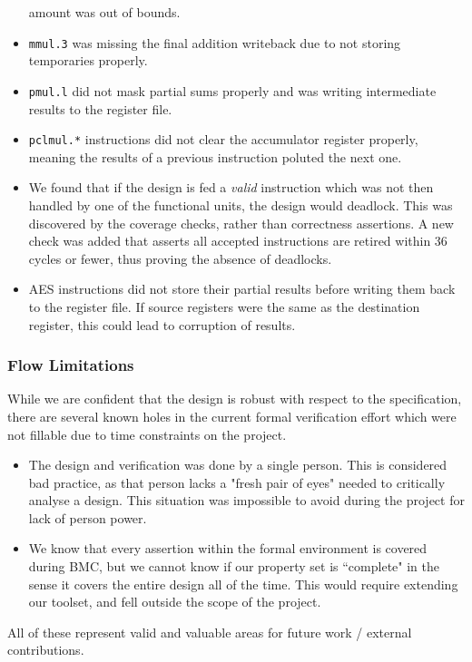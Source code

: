 \begin{itemize}
    amount was out of bounds.
\item {\tt mmul.3} was missing the final addition writeback due to not
    storing temporaries properly.
\item {\tt pmul.l} did not mask partial sums properly and was writing
    intermediate results to the register file.
\item {\tt pclmul.*} instructions did not clear the accumulator register
    properly, meaning the results of a previous instruction poluted the
    next one.
\item We found that if the design is fed a {\em valid} instruction which
    was not then handled by one of the functional units, the design would
    deadlock.
    This was discovered by the coverage checks, rather than correctness
    assertions.
    A new check was added that asserts all accepted instructions are
    retired within 36 cycles or fewer, thus proving the absence of
    deadlocks.
\item AES instructions did not store their partial results before
    writing them back to the register file. If source registers were the
    same as the destination register, this could lead to corruption of
    results.
\end{itemize}


\subsubsection{Flow Limitations}

While we are confident that the design is robust with respect to the
specification, there are several known holes in the current formal
verification effort which were not fillable due to time constraints on
the project.

\begin{itemize}
\item The design and verification was done by a single person. This
    is considered bad practice, as that person lacks a "fresh pair
    of eyes" needed to critically analyse a design.
    This situation was impossible to avoid during the project for
    lack of person power.
\item We know that every assertion within the formal environment is
    covered during BMC, but we cannot know if our property set is
    ``complete" in the sense it covers the entire design all of the
    time.
    This would require extending our toolset, and fell outside the
    scope of the project.
\end{itemize}

\noindent
All of these represent valid and valuable areas for future work /
external contributions.
